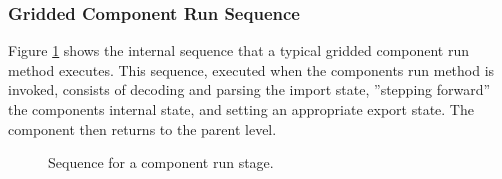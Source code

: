 \subsubsection{Gridded Component Run Sequence}
Figure \ref{fig:GriddedComponentsRunSequence} shows the internal sequence
that a typical gridded component run method executes. This sequence, 
executed when the components run method is invoked,
consists of decoding and parsing the import state, ''stepping forward'' the 
components internal state, and setting an appropriate export state. The 
component then returns to the parent level.
\begin{figure}
\caption[{Sequence in a Component Run}]{Sequence for a component
run stage.\\}
\begin{center}
\label{fig:GriddedComponentsRunSequence}
\end{center}
\end{figure}

